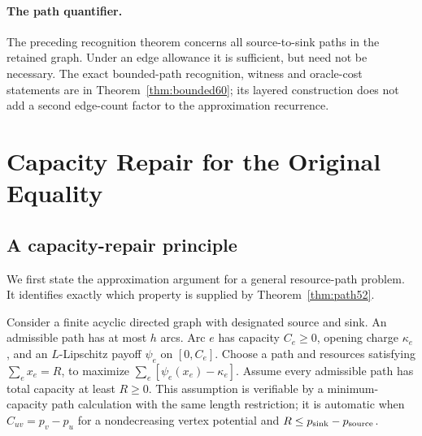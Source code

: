 \documentclass[11pt,letterpaper]{article}
\theoremstyle{definition}\newtheorem{remark}[theorem]{Remark}
\begin{document}
\paragraph{The path quantifier.} The preceding recognition theorem concerns all source-to-sink paths in the retained graph. Under an edge allowance it is sufficient, but need not be necessary. The exact bounded-path recognition, witness and oracle-cost statements are in Theorem~\ref{thm:bounded60}; its layered construction does not add a second edge-count factor to the approximation recurrence.
\section{Capacity Repair for the Original Equality}\label{sec:algorithm52}
\subsection{A capacity-repair principle}
We first state the approximation argument for a general resource-path problem. It identifies exactly which property is supplied by Theorem~\ref{thm:path52}.

Consider a finite acyclic directed graph with designated source and sink. An admissible path has at most $h$ arcs. Arc $e$ has capacity $C_e\geq0$, opening charge $\kappa_e$, and an $L$-Lipschitz payoff $\psi_e$ on $[0,C_e]$. Choose a path and resources satisfying $\sum_e x_e=R$, to maximize $\sum_e[\psi_e(x_e)-\kappa_e]$. Assume every admissible path has total capacity at least $R\geq0$. This assumption is verifiable by a minimum-capacity path calculation with the same length restriction; it is automatic when $C_{uv}=p_v-p_u$ for a nondecreasing vertex potential and $R\leq p_{\rm sink}-p_{\rm source}$.
\end{document}
